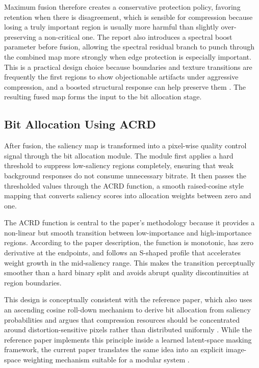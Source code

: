 \documentclass[11pt,                                                             
 superscriptaddress,twoside,
 amsmath,amssymb,
 aps, physrev
]{revtex4-2}
\begin{document}
Maximum fusion therefore creates a conservative protection policy, favoring retention when there is disagreement, which is sensible for compression because losing a truly important region is usually more harmful than slightly over-preserving a non-critical one. The report also introduces a spectral boost parameter before fusion, allowing the spectral residual branch to punch through the combined map more strongly when edge protection is especially important. This is a practical design choice because boundaries and texture transitions are frequently the first regions to show objectionable artifacts under aggressive compression, and a boosted structural response can help preserve them \cite{xu2022acm}. The resulting fused map forms the input to the bit allocation stage.

\subsection{Bit Allocation Using ACRD}
After fusion, the saliency map is transformed into a pixel-wise quality control signal through the bit allocation module. The module first applies a hard threshold to suppress low-saliency regions completely, ensuring that weak background responses do not consume unnecessary bitrate. It then passes the thresholded values through the ACRD function, a smooth raised-cosine style mapping that converts saliency scores into allocation weights between zero and one.

The ACRD function is central to the paper's methodology because it provides a non-linear but smooth transition between low-importance and high-importance regions. According to the paper description, the function is monotonic, has zero derivative at the endpoints, and follows an S-shaped profile that accelerates weight growth in the mid-saliency range. This makes the transition perceptually smoother than a hard binary split and avoids abrupt quality discontinuities at region boundaries.

This design is conceptually consistent with the reference paper, which also uses an ascending cosine roll-down mechanism to derive bit allocation from saliency probabilities and argues that compression resources should be concentrated around distortion-sensitive pixels rather than distributed uniformly \cite{li2024ieee}. While the reference paper implements this principle inside a learned latent-space masking framework, the current paper translates the same idea into an explicit image-space weighting mechanism suitable for a modular system \cite{li2023arxiv}.
\end{document}
